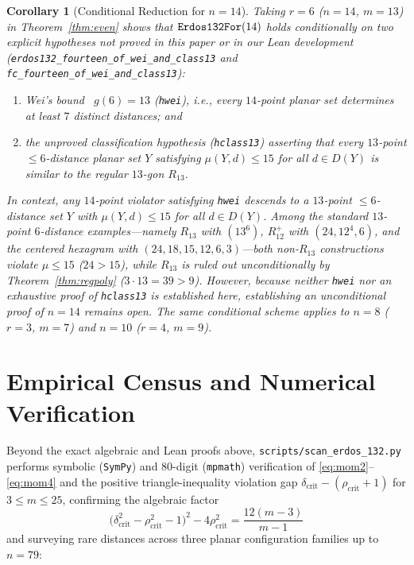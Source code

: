 \documentclass[11pt,reqno]{amsart}
\newtheorem{corollary}[theorem]{Corollary}
\theoremstyle{definition}
\begin{document}
\begin{corollary}[Conditional Reduction for $n = 14$]\label{cor:n14}
Taking $r = 6$ ($n = 14$, $m = 13$) in Theorem~\ref{thm:even} shows that $\text{\texttt{Erdos132For}}(14)$ holds \emph{conditionally} on two explicit hypotheses not proved in this paper or in our Lean development (\texttt{erdos132\_fourteen\_of\_wei\_and\_class13} and \texttt{fc\_fourteen\_of\_wei\_and\_class13}):
\begin{enumerate}
  \item Wei's bound~\cite{We12} $g(6) = 13$ (\texttt{hwei}), i.e., every $14$-point planar set determines at least $7$ distinct distances; and
  \item the unproved classification hypothesis (\texttt{hclass13}) asserting that every $13$-point $\le 6$-distance planar set $Y$ satisfying $\mu(Y, d) \le 15$ for all $d \in D(Y)$ is similar to the regular $13$-gon $R_{13}$.
\end{enumerate}
In context, any $14$-point violator satisfying \texttt{hwei} descends to a $13$-point $\le 6$-distance set $Y$ with $\mu(Y, d) \le 15$ for all $d \in D(Y)$. Among the standard $13$-point $6$-distance examples---namely $R_{13}$ with $(13^6)$, $R_{12}^+$ with $(24, 12^4, 6)$, and the centered hexagram with $(24, 18, 15, 12, 6, 3)$---both non-$R_{13}$ constructions violate $\mu \le 15$ ($24 > 15$), while $R_{13}$ is ruled out unconditionally by Theorem~\ref{thm:regpoly} ($3 \cdot 13 = 39 > 9$). However, because neither \texttt{hwei} nor an exhaustive proof of \texttt{hclass13} is established here, establishing an unconditional proof of $n = 14$ remains open. The same conditional scheme applies to $n = 8$ ($r = 3$, $m = 7$) and $n = 10$ ($r = 4$, $m = 9$).
\end{corollary}

\section{Empirical Census and Numerical Verification}

Beyond the exact algebraic and Lean proofs above, \texttt{scripts/\allowbreak scan\_\allowbreak erdos\_\allowbreak 132.py} performs symbolic (\texttt{SymPy}) and $80$-digit (\texttt{mpmath}) verification of \eqref{eq:mom2}--\eqref{eq:mom4} and the positive triangle-inequality violation gap $\delta_{\mathrm{crit}} - (\rho_{\mathrm{crit}} + 1)$ for $3 \le m \le 25$, confirming the algebraic factor
\[
\bigl(\delta_{\mathrm{crit}}^2 - \rho_{\mathrm{crit}}^2 - 1\bigr)^2 - 4\rho_{\mathrm{crit}}^2 = \frac{12(m - 3)}{m - 1}
\]
and surveying rare distances across three planar configuration families up to $n = 79$:
\end{document}
